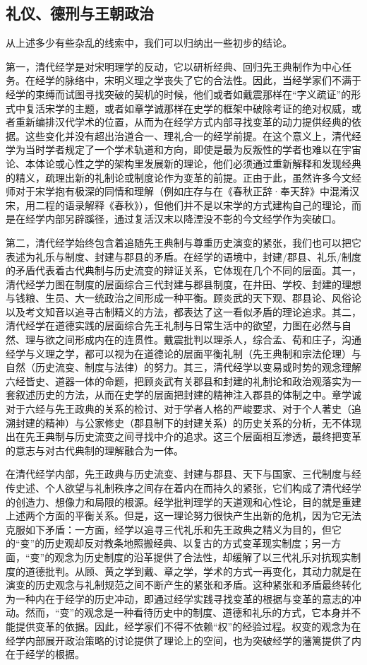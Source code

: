 \documentclass[a4paper, 12pt, openright]{ctexbook}
\begin{document}
\subsection{礼仪、德刑与王朝政治}

从上述多少有些杂乱的线索中，我们可以归纳出一些初步的结论。

第一，清代经学是对宋明理学的反动，它以研析经典、回归先王典制作为中心任务。在经学的脉络中，宋明义理之学丧失了它的合法性。因此，当经学家们不满于经学的束缚而试图寻找突破的契机的时候，他们或者如戴震那样在“字义疏证”的形式中复活宋学的主题，或者如章学诚那样在史学的框架中破除考证的绝对权威，或者重新编排汉代学术的位置，从而为在经学方式内部寻找变革的动力提供经典的依据。这些变化并没有超出治道合一、理礼合一的经学前提。在这个意义上，清代经学为当时学者规定了一个学术轨道和方向，即使是最为反叛性的学者也难以在宇宙论、本体论或心性之学的架构里发展新的理论，他们必须通过重新解释和发现经典的精义，疏理出新的礼制论或制度论作为变革的前提。正由于此，虽然许多今文经师对于宋学抱有极深的同情和理解（例如庄存与在《春秋正辞·奉天辞》中混淆汉宋，用二程的语录解释《春秋》），但他们并不是以宋学的方式建构自己的理论，而是在经学内部另辟蹊径，通过复活汉末以降湮没不彰的今文经学作为突破口。

第二，清代经学始终包含着追随先王典制与尊重历史演变的紧张，我们也可以把它表述为礼乐与制度、封建与郡县的矛盾。在经学的语境中，封建/郡县、礼乐/制度的矛盾代表着古代典制与历史流变的辩证关系，它体现在几个不同的层面。其一，清代经学力图在制度的层面综合三代封建与郡县制度，在井田、学校、封建的理想与钱粮、生员、大一统政治之间形成一种平衡。顾炎武的天下观、郡县论、风俗论以及考文知音以追寻古制精义的方法，都表达了这一看似矛盾的理论追求。其二，清代经学在道德实践的层面综合先王礼制与日常生活中的欲望，力图在必然与自然、理与欲之间形成内在的连贯性。戴震批判以理杀人，综合孟、荀和庄子，沟通经学与义理之学，都可以视为在道德论的层面平衡礼制（先王典制和宗法伦理）与自然（历史流变、制度与法律）的努力。其三，清代经学以变易或时势的观念理解六经皆史、道器一体的命题，把顾炎武有关郡县和封建的礼制论和政治观落实为一套叙述历史的方法，从而在史学的层面把封建的精神注入郡县的体制之中。章学诚对于六经与先王政典的关系的检讨、对于学者人格的严峻要求、对于个人著史（追溯封建的精神）与公家修史（郡县制下的封建关系）的历史关系的分析，无不体现出在先王典制与历史流变之间寻找中介的追求。这三个层面相互渗透，最终把变革的意志与对古代典制的理解融合为一体。

在清代经学内部，先王政典与历史流变、封建与郡县、天下与国家、三代制度与经传史述、个人欲望与礼制秩序之间存在着内在而持久的紧张，它们构成了清代经学的创造力、想像力和局限的根源。经学批判理学的天道观和心性论，目的就是重建上述两个方面的平衡关系。但是，这一理论努力很快产生出新的危机，因为它无法克服如下矛盾：一方面，经学以追寻三代礼乐和先王政典之精义为目的，但它的“变”的历史观却反对教条地照搬经典、以复古的方式变革现实制度；另一方面，“变”的观念为历史制度的沿革提供了合法性，却缓解了以三代礼乐对抗现实制度的道德批判。从顾、黄之学到戴、章之学，学术的方式一再变化，其动力就是在演变的历史观念与礼制规范之间不断产生的紧张和矛盾。这种紧张和矛盾最终转化为一种内在于经学的历史冲动，即通过经学实践寻找变革的根据与变革的意志的冲动。然而，“变”的观念是一种看待历史中的制度、道德和礼乐的方式，它本身并不能提供变革的依据。因此，经学家们不得不依赖“权”的经验过程。权变的观念为在经学内部展开政治策略的讨论提供了理论上的空间，也为突破经学的藩篱提供了内在于经学的根据。
\end{document}
